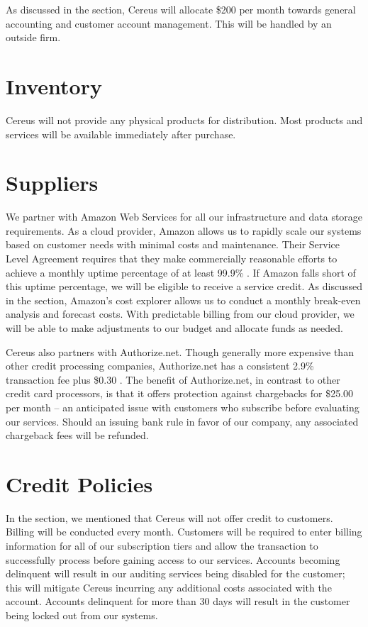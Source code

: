 As discussed in the  section, Cereus will allocate \$200 per month towards general accounting and customer account management. This will be handled by an outside firm.

\section{Inventory}

Cereus will not provide any physical products for distribution. Most products and services will be available immediately after purchase.

\section{Suppliers}

We partner with Amazon Web Services for all our infrastructure and data storage requirements. As a cloud provider, Amazon allows us to rapidly scale our systems based on customer needs with minimal costs and maintenance. Their Service Level Agreement requires that they make commercially reasonable efforts to achieve a monthly uptime percentage of at least 99.9\% \cite{amazon.2019}. If Amazon falls short of this uptime percentage, we will be eligible to receive a service credit. As discussed in the  section, Amazon's cost explorer allows us to conduct a monthly break-even analysis and forecast costs. With predictable billing from our cloud provider, we will be able to make adjustments to our budget and allocate funds as needed.

Cereus also partners with Authorize.net. Though generally more expensive than other credit processing companies, Authorize.net has a consistent 2.9\% transaction fee plus \$0.30 \cite{yowana.2019}. The benefit of Authorize.net, in contrast to other credit card processors, is that it offers protection against chargebacks for \$25.00 per month -- an anticipated issue with customers who subscribe before evaluating our services. Should an issuing bank rule in favor of our company, any associated chargeback fees will be refunded.

\section{Credit Policies}

In the  section, we mentioned that Cereus will not offer credit to customers. Billing will be conducted every month. Customers will be required to enter billing information for all of our subscription tiers and allow the transaction to successfully process before gaining access to our services. Accounts becoming delinquent will result in our auditing services being disabled for the customer; this will mitigate Cereus incurring any additional costs associated with the account. Accounts delinquent for more than 30 days will result in the customer being locked out from our systems.
